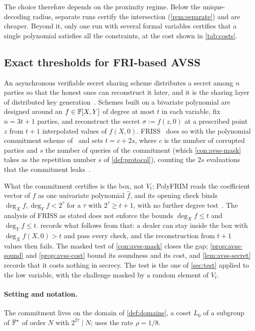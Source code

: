 The choice therefore depends on the proximity regime. Below the unique-decoding radius,
separate runs certify the intersection (\cref{rem:separate}) and are cheaper. Beyond it, only
one run with several formal variables certifies that a single polynomial satisfies all the
constraints, at the cost shown in \cref{tab:costs}.

\subsection{Exact thresholds for {FRI}-based {AVSS}}\label{sec:avss}

An asynchronous verifiable secret sharing scheme distributes a secret among $n$ parties so that
the honest ones can reconstruct it later, and it is the sharing layer of distributed key
generation~\cite{Bingo23}. Schemes built on a bivariate polynomial are designed around an
$f\in\mathbb{F}[X,Y]$ of degree at most $t$ in each variable, fix $n=3t+1$ parties, and reconstruct the
secret $\sigma:=f(z,0)$ at a prescribed point $z$ from $t+1$ interpolated values of $f(X,0)$.
FRISS~\cite{PolyFRIM} does so with the polynomial commitment
scheme of~\cite{PolyFRIM} and sets $t=c+2s$, where $c$ is the number of corrupted parties and
$s$ the number of queries of the commitment (which \cref{con:avss-mask} takes as the repetition number $s$ of \cref{def:protocol}), counting the $2s$ evaluations that the commitment
leaks~\cite[App.~D]{PolyFRIM}.

What the commitment certifies is the box, not $V_t$: PolyFRIM reads the coefficient vector of
$f$ as one univariate polynomial $\hat f$, and its opening check binds $\deg_Xf,\deg_Yf<2^\tau$
for a $\tau$ with $2^\tau\ge t+1$, with no further degree
test~\cite[\S3.3, Def.~2.3, App.~B, App.~D]{PolyFRIM}. The analysis of FRISS as stated does not
enforce the bounds $\deg_Xf\le t$ and $\deg_Yf\le t$.  records what
follows from that: a dealer can stay inside the box with $\deg_Xf(X,0)>t$ and pass every check,
and the reconstruction from $t+1$ values then fails. The masked test of \cref{con:avss-mask}
closes the gap; \cref{prop:avss-sound} and \cref{prop:avss-cost} bound its soundness and its
cost, and \cref{lem:avss-secret} records that it costs nothing in secrecy. The test is the one
of \cref{sec:test} applied to the low variable, with the challenge masked by a random element of
$V_t$.

\paragraph{Setting and notation.} The commitment lives on the domain of \cref{def:domains}, a
coset $L_0$ of a subgroup of $\mathbb{F}^*$ of order $N$ with $2^{2\tau}\mid N$; \cite[\S5]{PolyFRIM}
uses the rate $\rho=1/8$.

